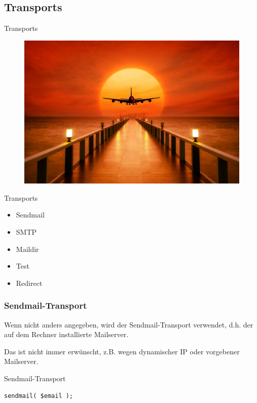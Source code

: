 \subsection{Transports}

\begin{frame}{Transports}
  \begin{figure}[!ht]
    \centering
    \includegraphics[width=0.9\linewidth]{img/sunset-3193002_1920.jpg}
  \end{figure}
\end{frame}

\begin{frame}{Transports}
  \begin{itemize}
    \item Sendmail
    \item SMTP
    \item Maildir
    \item Test
    \item Redirect
  \end{itemize}
\end{frame}

\subsubsection{Sendmail-Transport}

Wenn nicht anders angegeben, wird der Sendmail-Transport verwendet, d.h. der
auf dem Rechner installierte Mailserver.

Das ist nicht immer erwünscht, z.B. wegen dynamischer IP oder vorgebener
Mailserver.

\begin{frame}[fragile]{Sendmail-Transport}
\begin{verbatim}
sendmail( $email );
\end{verbatim}
\end{frame}

